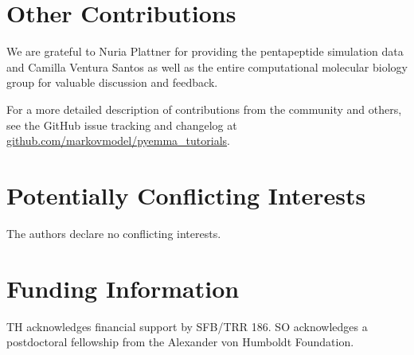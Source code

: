 \documentclass[9pt,tutorial]{livecoms}
\newcommand{\githubrepository}{\url{github.com/markovmodel/pyemma_tutorials}}
\begin{document}
\section{Other Contributions}
%
We are grateful to Nuria Plattner for providing the pentapeptide simulation data and Camilla Ventura Santos as well as the entire computational molecular biology group for valuable discussion and feedback.

For a more detailed description of contributions from the community and others, see the GitHub issue tracking and changelog at \githubrepository{}.

\section{Potentially Conflicting Interests}
The authors declare no conflicting interests.

\section{Funding Information}
TH acknowledges financial support by SFB/TRR 186. SO acknowledges a postdoctoral fellowship from the Alexander von Humboldt Foundation.




\end{document}
